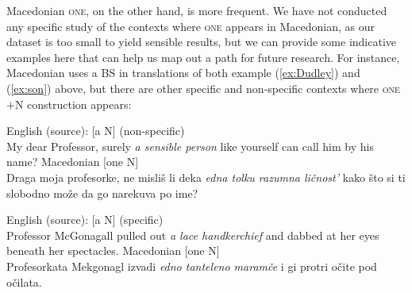 \documentclass[output=paper,colorlinks,citecolor=brown]{langscibook}
\begin{document}
Macedonian \textsc{one}, on the other hand, is more frequent. We have not conducted any specific study of the contexts where \textsc{one} appears in Macedonian, as our dataset is too small to yield sensible results, but we can provide some indicative examples here that can help us map out a path for future research. For instance, Macedonian uses a BS in translations of both example (\ref{ex:Dudley}) and (\ref{ex:son}) above, but there are other specific and non-specific contexts where \textsc{one}$+$N construction appears: 

\ea \ea \label{sensible} English (source): [a N] \hfill (non-specific)\\
My dear Professor, surely \textit{a sensible person} like yourself can call him by his name?
\ex \label{sensiblemk} Macedonian [one N]\\
Draga moja profesorke, ne misli\v{s} li deka \textit{edna tolku razumna li\v{c}nost'} kako \v{s}to si ti slobodno mo\v{z}e da go narekuva po ime? 

 \z\z

\ea \ea \label{handker} English (source): [a N] \hfill (specific)\\
Professor McGonagall pulled out \textit{a lace handkerchief} and dabbed at her eyes beneath her spectacles.
\ex \label{hankermk} Macedonian [one N]\\
Profesorkata Mekgonagl izvadi \textit{edno tanteleno maramče} i gi protri očite pod očilata.
 \z\z
\end{document}
